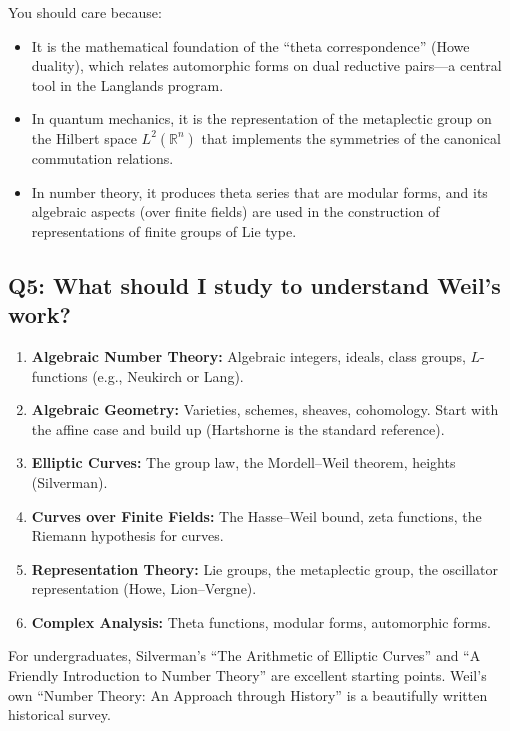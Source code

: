 You should care because:
\begin{itemize}
    \item It is the mathematical foundation of the ``theta correspondence'' (Howe duality), which relates automorphic forms on dual reductive pairs---a central tool in the Langlands program.
    \item In quantum mechanics, it is the representation of the metaplectic group on the Hilbert space $L^2(\mathbb{R}^n)$ that implements the symmetries of the canonical commutation relations.
    \item In number theory, it produces theta series that are modular forms, and its algebraic aspects (over finite fields) are used in the construction of representations of finite groups of Lie type.
\end{itemize}

\subsection*{Q5: What should I study to understand Weil's work?}

\begin{enumerate}
    \item \textbf{Algebraic Number Theory:} Algebraic integers, ideals, class groups, $L$-functions (e.g., Neukirch or Lang).
    \item \textbf{Algebraic Geometry:} Varieties, schemes, sheaves, cohomology. Start with the affine case and build up (Hartshorne is the standard reference).
    \item \textbf{Elliptic Curves:} The group law, the Mordell--Weil theorem, heights (Silverman).
    \item \textbf{Curves over Finite Fields:} The Hasse--Weil bound, zeta functions, the Riemann hypothesis for curves.
    \item \textbf{Representation Theory:} Lie groups, the metaplectic group, the oscillator representation (Howe, Lion--Vergne).
    \item \textbf{Complex Analysis:} Theta functions, modular forms, automorphic forms.
\end{enumerate}

For undergraduates, Silverman's ``The Arithmetic of Elliptic Curves'' and ``A Friendly Introduction to Number Theory'' are excellent starting points. Weil's own ``Number Theory: An Approach through History'' is a beautifully written historical survey.

